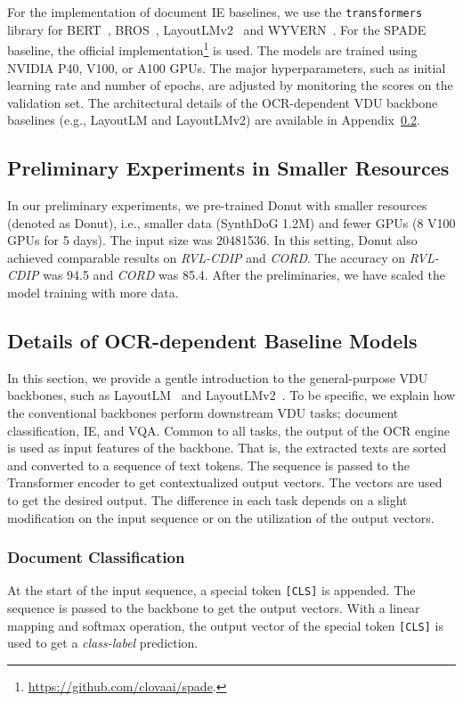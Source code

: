 \documentclass[runningheads]{llncs}
\newcommand\ours{{{\mbox{Donut}}}\xspace}
\begin{document}
For the implementation of document IE baselines, we use the \texttt{transformers} library for BERT~\cite{devlinBERT2018}, BROS~\cite{hong2021bros}, LayoutLMv2~\cite{xu-etal-2021-layoutlmv2,layoutxlm} and WYVERN~\cite{hwang2021costeffective}.
For the SPADE~\cite{hwang-etal-2021-spatial} baseline, the official implementation\footnote{\url{https://github.com/clovaai/spade}.} is used.
The models are trained using NVIDIA P40, V100, or A100 GPUs. The major hyperparameters, such as initial learning rate and number of epochs, are adjusted by monitoring the scores on the validation set. The architectural details of the OCR-dependent VDU backbone baselines (e.g., LayoutLM and LayoutLMv2) are available in Appendix~\ref{sec:detail_of_VDU_backbone}.

\subsection{Preliminary Experiments in Smaller Resources}\label{sec:smaller_resources}
In our preliminary experiments, we pre-trained \ours with smaller resources (denoted as Donut), i.e., smaller data (SynthDoG 1.2M) and fewer GPUs (8 V100 GPUs for 5 days). The input size was 20481536. In this setting, Donut also achieved comparable results on \textit{RVL-CDIP} and \textit{CORD}. The accuracy on \textit{RVL-CDIP} was 94.5 and \textit{CORD} was 85.4.
After the preliminaries, we have scaled the model training with more data.

\subsection{Details of OCR-dependent Baseline Models}\label{sec:detail_of_VDU_backbone}
In this section, we provide a gentle introduction to the general-purpose VDU backbones, such as LayoutLM~\cite{xu2019_layoutLM} and LayoutLMv2~\cite{xu-etal-2021-layoutlmv2}.
To be specific, we explain how the conventional backbones perform downstream VDU tasks; document classification, IE, and VQA.
Common to all tasks, the output of the OCR engine is used as input features of the backbone.
That is, the extracted texts are sorted and converted to a sequence of text tokens. The sequence is passed to the Transformer encoder to get contextualized output vectors.
The vectors are used to get the desired output.
The difference in each task depends on a slight modification on the input sequence or on the utilization of the output vectors.

\subsubsection{Document Classification}
At the start of the input sequence, a special token \texttt{[CLS]} is appended.
The sequence is passed to the backbone to get the output vectors.
With a linear mapping and softmax operation, the output vector of the special token \texttt{[CLS]} is used to get a \textit{class-label} prediction.
\end{document}
